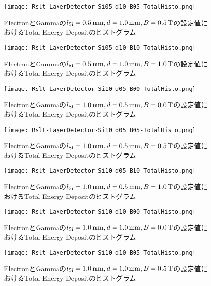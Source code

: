 \documentclass[a4paper,10pt]{jreport}
\begin{document}
\begin{figure}[H]
	\center
	\texttt{[image: Rslt-LayerDetector-Si05\_d10\_B05-TotalHisto.png]}
	\caption{ElectronとGammaの$l_{\rm{Si}}=\SI{0.5}{mm}, d=\SI{1.0}{mm}, B=\SI{0.5}{T}$の設定値におけるTotal Energy Depositのヒストグラム}
	\label{Rslt-LayerDetector-Si05_d10_B05-TotalHisto}
\end{figure}

\begin{figure}[H]
	\center
	\texttt{[image: Rslt-LayerDetector-Si05\_d10\_B10-TotalHisto.png]}
	\caption{ElectronとGammaの$l_{\rm{Si}}=\SI{0.5}{mm}, d=\SI{1.0}{mm}, B=\SI{1.0}{T}$の設定値におけるTotal Energy Depositのヒストグラム}
	\label{Rslt-LayerDetector-Si05_d10_B10-TotalHisto}
\end{figure}

\begin{figure}[H]
	\center
	\texttt{[image: Rslt-LayerDetector-Si10\_d05\_B00-TotalHisto.png]}
	\caption{ElectronとGammaの$l_{\rm{Si}}=\SI{1.0}{mm}, d=\SI{0.5}{mm}, B=\SI{0.0}{T}$の設定値におけるTotal Energy Depositのヒストグラム}
	\label{Rslt-LayerDetector-Si10_d05_B00-TotalHisto}
\end{figure}

\begin{figure}[H]
	\center
	\texttt{[image: Rslt-LayerDetector-Si10\_d05\_B05-TotalHisto.png]}
	\caption{ElectronとGammaの$l_{\rm{Si}}=\SI{1.0}{mm}, d=\SI{0.5}{mm}, B=\SI{0.5}{T}$の設定値におけるTotal Energy Depositのヒストグラム}
	\label{Rslt-LayerDetector-Si10_d05_B05-TotalHisto}
\end{figure}

\begin{figure}[H]
	\center
	\texttt{[image: Rslt-LayerDetector-Si10\_d05\_B10-TotalHisto.png]}
	\caption{ElectronとGammaの$l_{\rm{Si}}=\SI{1.0}{mm}, d=\SI{0.5}{mm}, B=\SI{1.0}{T}$の設定値におけるTotal Energy Depositのヒストグラム}
	\label{Rslt-LayerDetector-Si10_d05_B10-TotalHisto}
\end{figure}

\begin{figure}[H]
	\center
	\texttt{[image: Rslt-LayerDetector-Si10\_d10\_B00-TotalHisto.png]}
	\caption{ElectronとGammaの$l_{\rm{Si}}=\SI{1.0}{mm}, d=\SI{1.0}{mm}, B=\SI{0.0}{T}$の設定値におけるTotal Energy Depositのヒストグラム}
	\label{Rslt-LayerDetector-Si10_d10_B00-TotalHisto}
\end{figure}

\begin{figure}[H]
	\center
	\texttt{[image: Rslt-LayerDetector-Si10\_d10\_B05-TotalHisto.png]}
	\caption{ElectronとGammaの$l_{\rm{Si}}=\SI{1.0}{mm}, d=\SI{1.0}{mm}, B=\SI{0.5}{T}$の設定値におけるTotal Energy Depositのヒストグラム}
	\label{Rslt-LayerDetector-Si10_d10_B05-TotalHisto}
\end{figure}
\end{document}
